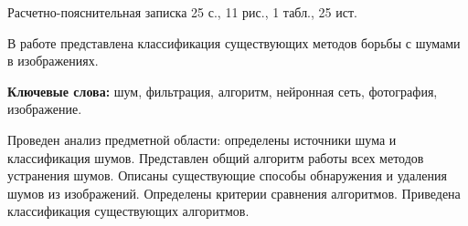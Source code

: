 Расчетно-пояснительная записка 25 с., 11 рис., 1 табл., 25 ист.

В работе представлена классификация существующих методов борьбы с шумами в изображениях.

\textbf{Ключевые слова:} шум, фильтрация, алгоритм, нейронная сеть, фотография, изображение.

Проведен анализ предметной области: определены источники шума и классификация шумов. 
Представлен общий алгоритм работы всех методов устранения шумов. 
Описаны существующие способы обнаружения и удаления шумов из изображений.
Определены критерии сравнения алгоритмов. 
Приведена классификация существующих алгоритмов.